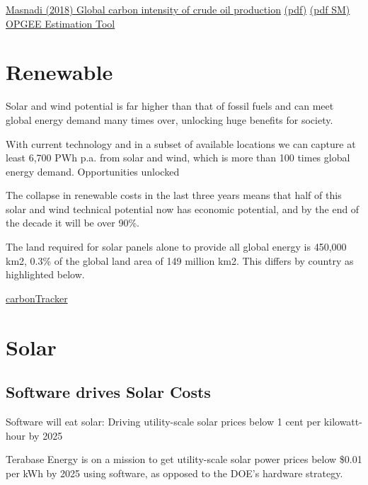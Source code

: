 \documentclass[
]{book}
\begin{document}
\href{https://www.osti.gov/pages/biblio/1485127}{Masnadi (2018) Global carbon intensity of crude oil production}
\href{pdf/Masnadi_2018_Carbon_Intensity_of_Crude_Oil_Production.pdf}{(pdf)}
\href{pdf/Masnadi_2018_Carbon_Intensity_of_Crude_Oil_Production_SM.pdf}{(pdf SM)}
\href{https://eao.stanford.edu/research-areas/opgeehttps://eao.stanford.edu/research-areas/opgee}{OPGEE Estimation Tool}

\hypertarget{renewable}{%
\chapter{Renewable}\label{renewable}}

Solar and wind potential is far higher than that of fossil fuels and can meet global energy demand many times over, unlocking huge benefits for society.

With current technology and in a subset of available locations we can capture at least 6,700 PWh p.a. from solar and wind, which is more than 100 times global energy demand.
Opportunities unlocked

The collapse in renewable costs in the last three years means that half of this solar and wind technical potential now has economic potential, and by the end of the decade it will be over 90\%.

The land required for solar panels alone to provide all global energy is 450,000 km2, 0.3\% of the global land area of 149 million km2. This differs by country as highlighted below.

\href{https://carbontracker.org/reports/the-skys-the-limit-solar-wind/}{carbonTracker}

\hypertarget{solar}{%
\chapter{Solar}\label{solar}}

\hypertarget{software-drives-solar-costs}{%
\section{Software drives Solar Costs}\label{software-drives-solar-costs}}

Software will eat solar: Driving utility-scale solar prices below 1 cent per kilowatt-hour by 2025

Terabase Energy is on a mission to get utility-scale solar power prices below \$0.01 per kWh by 2025 using software, as opposed to the DOE's hardware strategy.
\end{document}
